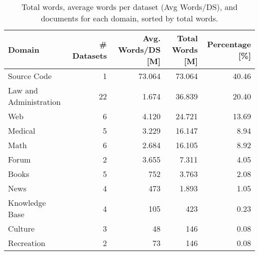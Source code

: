 \begin{table}
\centering
\begin{tabular}{lrrrr}
\hline
Domain                 & \# Datasets & Avg. Words/DS [M] & Total Words [M] & Percentage [\%] \\ \hline
Source Code            & 1        & 73.064                & 73.064      & 40.46           \\
Law and Administration & 22       & 1.674                 & 36.839      & 20.40           \\
Web                    & 6        & 4.120                 & 24.721      & 13.69           \\
Medical                & 5        & 3.229                 & 16.147      & 8.94            \\
Math                   & 6        & 2.684                 & 16.105      & 8.92            \\
Forum                  & 2        & 3.655                 & 7.311       & 4.05            \\
Books                  & 5        & 752                   & 3.763       & 2.08            \\
News                   & 4        & 473                   & 1.893       & 1.05            \\
Knowledge Base         & 4        & 105                   & 423         & 0.23            \\
Culture                & 3        & 48                    & 146         & 0.08            \\
Recreation             & 2        & 73                    & 146         & 0.08            \\ \hline
\end{tabular}
\caption{Total words, average words per dataset (Avg Words/DS), and documents for each domain, sorted by total words. }
\label{tab:word_distribution_per_domain}
\end{table}